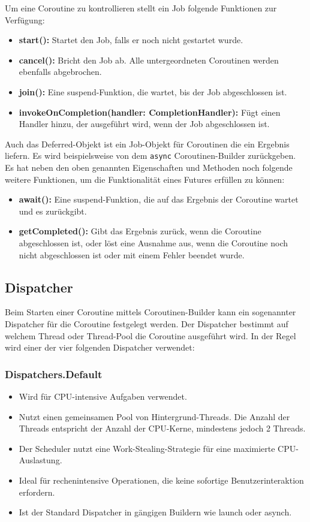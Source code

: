 \documentclass[fontsize=12pt,paper=a4,twoside=semi,parskip=half-,headsepline,headinclude]{scrreprt}
\begin{document}
Um eine Coroutine zu kontrollieren stellt ein Job folgende Funktionen zur Verfügung:

\begin{itemize}
	\item \textbf{start():} Startet den Job, falls er noch nicht gestartet wurde.
	\item \textbf{cancel():} Bricht den Job ab. Alle untergeordneten Coroutinen werden ebenfalls abgebrochen.
	\item \textbf{join():} Eine suspend-Funktion, die wartet, bis der Job abgeschlossen ist.
	\item \textbf{invokeOnCompletion(handler: CompletionHandler):} Fügt einen Handler hinzu, der ausgeführt wird, wenn der Job abgeschlossen ist.
\end{itemize}

Auch das Deferred-Objekt ist ein Job-Objekt für Coroutinen die ein Ergebnis liefern. Es wird beispielsweise von dem \texttt{async} Coroutinen-Builder zurückgeben. Es hat neben den oben genannten Eigenschaften und Methoden noch folgende weitere Funktionen, um die Funktionalität eines Futures erfüllen zu können:

\begin{itemize}
	\item \textbf{await():} Eine suspend-Funktion, die auf das Ergebnis der Coroutine wartet und es zurückgibt.
	\item \textbf{getCompleted():} Gibt das Ergebnis zurück, wenn die Coroutine abgeschlossen ist, oder löst eine Ausnahme aus, wenn die Coroutine noch nicht abgeschlossen ist oder mit einem Fehler beendet wurde.
\end{itemize}

\subsection{Dispatcher}

Beim Starten einer Coroutine mittels Coroutinen-Builder kann ein sogenannter Dispatcher für die Coroutine festgelegt werden. Der Dispatcher bestimmt auf welchem Thread oder Thread-Pool die Coroutine ausgeführt wird. In der Regel wird einer der vier folgenden Dispatcher verwendet:

\subsubsection{Dispatchers.Default}

\begin{itemize}
	\item Wird für CPU-intensive Aufgaben verwendet.
	\item Nutzt einen gemeinsamen Pool von Hintergrund-Threads. Die Anzahl der Threads entspricht der Anzahl der CPU-Kerne, mindestens jedoch 2 Threads.
	\item Der Scheduler nutzt eine Work-Stealing-Strategie für eine maximierte CPU-Auslastung.
	\item Ideal für rechenintensive Operationen, die keine sofortige Benutzerinteraktion erfordern.
	\item Ist der Standard Dispatcher in gängigen Buildern wie launch oder asynch.
\end{itemize}
\end{document}
